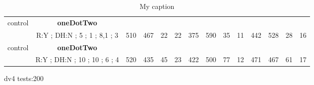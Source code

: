 \begin{table}[]
{\begin{tabular}{|c|c|c|c|c|c|c|c|c|c|c|c|c|c|}
control & \cellcolor{blue!15}\textbf{oneDotTwo}& {\color[HTML]{00009B} } & {\color[HTML]{9A0000} } & {\color[HTML]{009901} } &  & {\color[HTML]{00009B} } & {\color[HTML]{9A0000} } & {\color[HTML]{009901} } &  & {\color[HTML]{00009B} } & {\color[HTML]{9A0000} } & {\color[HTML]{009901} } &  \\ 
 & \cellcolor{ blue!15}R:Y ; DH:N ; 5 ; 1 ; 8,1 ; 3 & \multirow{-2}{*}{{\color[HTML]{00009B} 510}} & \multirow{-2}{*}{{\color[HTML]{9A0000} 467}} & \multirow{-2}{*}{{\color[HTML]{009901} 22}} & \multirow{-2}{*}{22} & \multirow{-2}{*}{{\color[HTML]{00009B} 375}} & \multirow{-2}{*}{{\color[HTML]{9A0000} 590}} & \multirow{-2}{*}{{\color[HTML]{009901} 35}} & \multirow{-2}{*}{11} & \multirow{-2}{*}{{\color[HTML]{00009B} 442}} & \multirow{-2}{*}{{\color[HTML]{9A0000} 528}} & \multirow{-2}{*}{{\color[HTML]{009901} 28}} & \multirow{-2}{*}{16} \\ \hline

control & \cellcolor{blue!15}\textbf{oneDotTwo}& {\color[HTML]{00009B} } & {\color[HTML]{9A0000} } & {\color[HTML]{009901} } &  & {\color[HTML]{00009B} } & {\color[HTML]{9A0000} } & {\color[HTML]{009901} } &  & {\color[HTML]{00009B} } & {\color[HTML]{9A0000} } & {\color[HTML]{009901} } &  \\ 
 & \cellcolor{ blue!15}R:Y ; DH:N ; 10 ; 10 ; 6 ; 4 & \multirow{-2}{*}{{\color[HTML]{00009B} 520}} & \multirow{-2}{*}{{\color[HTML]{9A0000} 435}} & \multirow{-2}{*}{{\color[HTML]{009901} 45}} & \multirow{-2}{*}{23} & \multirow{-2}{*}{{\color[HTML]{00009B} 422}} & \multirow{-2}{*}{{\color[HTML]{9A0000} 500}} & \multirow{-2}{*}{{\color[HTML]{009901} 77}} & \multirow{-2}{*}{12} & \multirow{-2}{*}{{\color[HTML]{00009B} 471}} & \multirow{-2}{*}{{\color[HTML]{9A0000} 467}} & \multirow{-2}{*}{{\color[HTML]{009901} 61}} & \multirow{-2}{*}{17} \\ \hline
\end{tabular}} \caption{ My caption} \label{ my - label} \end{table}


dv4 tests:200

